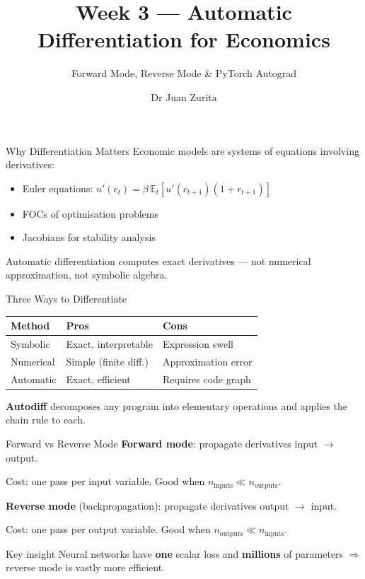 \documentclass[aspectratio=169, 10pt]{beamer}
\title{Week 3 --- Automatic Differentiation for Economics}
\subtitle{Forward Mode, Reverse Mode \& PyTorch Autograd}
\author{Dr Juan Zurita}
\institute{Deep Learning for Macroeconomics\\
The University of Edinburgh~$\cdot$~School of Economics}
\date{}
\begin{document}
\maketitle

\begin{frame}{Why Differentiation Matters}
Economic models are systems of equations involving derivatives:

\bigskip
\begin{itemize}
\item Euler equations: $u'(c_t) = \beta\,\mathbb{E}_t[u'(c_{t+1})(1 + r_{t+1})]$
\item FOCs of optimisation problems
\item Jacobians for stability analysis
\end{itemize}

\bigskip
\alert{Automatic differentiation} computes exact derivatives --- not numerical approximation, not symbolic algebra.
\end{frame}

\begin{frame}{Three Ways to Differentiate}
\begin{center}
\begin{tabular}{lll}
\toprule
Method & Pros & Cons \\
\midrule
Symbolic & Exact, interpretable & Expression swell \\
Numerical & Simple (finite diff.) & Approximation error \\
Automatic & Exact, efficient & Requires code graph \\
\bottomrule
\end{tabular}
\end{center}

\bigskip
\textbf{Autodiff} decomposes any program into elementary operations and applies the chain rule to each.
\end{frame}

\begin{frame}{Forward vs Reverse Mode}
\textbf{Forward mode}: propagate derivatives input $\to$ output.

Cost: one pass per input variable. Good when $n_{\text{inputs}} \ll n_{\text{outputs}}$.

\bigskip
\textbf{Reverse mode} (backpropagation): propagate derivatives output $\to$ input.

Cost: one pass per output variable. Good when $n_{\text{outputs}} \ll n_{\text{inputs}}$.

\bigskip
\begin{block}{Key insight}
Neural networks have \textbf{one} scalar loss and \textbf{millions} of parameters $\Rightarrow$ reverse mode is vastly more efficient.
\end{block}
\end{frame}
\end{document}

